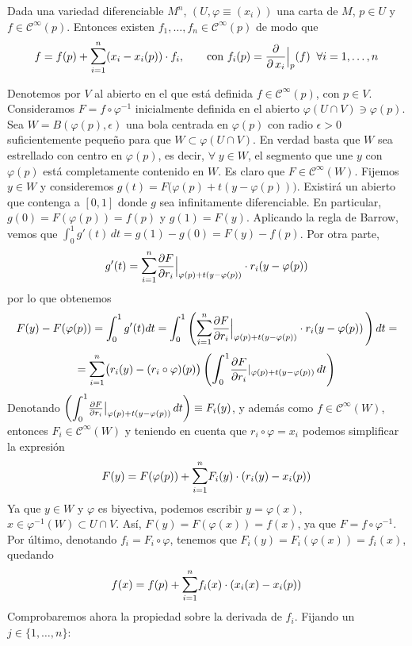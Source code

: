 \begin{lem}
Dada una variedad diferenciable $M^n$, $(U,\varphi\equiv(x_i))$ una carta de $M$, $p \in U$ y $f \in \mathcal{C}^{\infty}(p)$. Entonces existen $f_1, \dots, f_n \in \mathcal{C}^{\infty}(p)$ de modo que $$f = f(p) + \mathlarger{\sum}_{i=1}^n (x_i - x_i(p)) \cdot f_i, \qquad \text{con } f_i(p) = \frac{\partial}{\partial \, x_i} {\Big|_p}(f) \;\; \forall i = 1,\dots,n$$
\end{lem}
\begin{dem}
Denotemos por $V$ al abierto en el que está definida $f \in \mathcal{C}^{\infty}(p)$, con $p\in V$. Consideramos $F = f \circ \varphi^{-1}$ inicialmente definida en el abierto $\varphi(U \cap V) \ni \varphi(p)$. Sea $W = B(\varphi(p),\epsilon)$ una bola centrada en $\varphi(p)$ con radio $\epsilon > 0$ suficientemente pequeño para que $W \subset \varphi(U \cap V)$. En verdad basta que $W$ sea estrellado con centro en $\varphi(p)$, es decir, $\forall\; y\in W$, el segmento que une $y$ con $\varphi(p)$ está completamente contenido en $W$. Es claro que $F \in \mathcal{C}^{\infty}(W)$. Fijemos $y \in W$ y consideremos $g(t) = F\big(\varphi(p) + t(y-\varphi(p))\big)$. Existirá un abierto que contenga a $[0,1]$ donde $g$ sea infinitamente diferenciable. En particular, $g(0)=F(\varphi(p)) = f(p)$ y $g(1) = F(y)$. Aplicando la regla de Barrow, vemos que $\int_0^1 g'(t)\,dt = g(1)-g(0) = F(y) - f(p)$. Por otra parte, $$g'(t) = \mathlarger{\sum}_{i=1}^n \frac{\partial F}{\partial r_i}{\Big|_{\varphi(p)+t(y-\varphi(p))}} \cdot r_i(y-\varphi(p))$$por lo que obtenemos
$$F(y)-F(\varphi(p)) = \int_0^1 g'(t)dt=\int_0^1  \left( \mathlarger{\sum}_{i=1}^n \frac{\partial F}{\partial r_i}{\Big|_{\varphi(p)+t(y-\varphi(p))}} \cdot r_i(y-\varphi(p))\, \right) dt = $$ $$ = \mathlarger{\sum}_{i=1}^n  \big(r_i(y) - (r_i \circ \varphi)(p)\big)\left(\mathlarger{\int}_0^1  \frac{\partial F}{\partial r_i}{|_{\varphi(p)+t(y-\varphi(p))}} \,dt \right) $$
Denotando $\left(\mathlarger{\int}_0^1 \frac{\partial F}{\partial r_i}{\big|_{\varphi(p)+t(y-\varphi(p))}} \,dt \right) \equiv F_i(y)$, y adem\'as como $f \in \mathcal{C}^{\infty}(W)$, entonces $F_i \in \mathcal{C}^{\infty}(W)$ y teniendo en cuenta que $r_i \circ \varphi = x_i$ podemos simplificar la expresión $$F(y) = F(\varphi(p)) + \mathlarger{\sum}_{i=1}^n F_i(y) \cdot (r_i(y) - x_i(p))$$
Ya que $y \in W$ y $\varphi$ es biyectiva, podemos escribir $y = \varphi(x)$, $x \in \varphi^{-1}(W) \subset U \cap V$. Así, $F(y) = F(\varphi(x)) = f(x)$, ya que $F = f\circ\varphi^{-1}$. Por último, denotando $f_i = F_i \circ \varphi$, tenemos que $F_i(y) = F_i(\varphi(x)) = f_i(x)$, quedando $$f(x) = f(p) + \mathlarger{\sum}_{i=1}^n f_i(x) \cdot (x_i(x) - x_i(p))$$
Comprobaremos ahora la propiedad sobre la derivada de $f_i$. Fijando un $j \in \{1,\dots,n\}$:


\end{dem}

